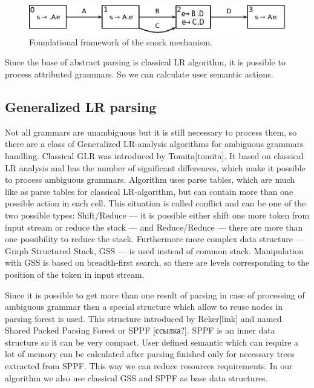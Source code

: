 \documentclass{sigplanconf}
\begin{document}
\begin{figure}
    \begin{center}
        \includegraphics[scale=0.5]{Graphs/simple_grammar_items.eps}
    \end{center}
    \caption{Foundational framework of the snork mechanism.}
    \label{fig-ffsm}
\end{figure}

Since the base of abstract parsing is classical LR algorithm, it is possible to process attributed grammars. So we can calculate user semantic actions. 

\subsection{Generalized LR parsing}
	Not all grammars are unambiguous but it is still necessary to process them, so there are a class of Generalized LR-analysis algorithms for ambiguous grammars handling. Classical GLR was introduced by Tomita[tomita]. It based on classical LR analysis and has the number of significant differences, which make it possible to process ambiguous grammars. Algorithm uses parse tables, which are much like as parse tables for classical LR-algorithm, but can contain more than one possible action in each cell. This situation is called conflict and can be one of the two possible types: Shift/Reduce — it is possible either shift one more token from input stream or reduce the stack — and Reduce/Reduce — there are more than one possibility to reduce the stack. Furthermore more complex data structure — Graph Structured Stack, GSS — is used instead of common stack. Manipulation with GSS is based on breadth-first search, so there are levels corresponding to the position of the token in input stream. 

Since it is possible to get more than one result of parsing in case of processing of ambiguous grammar then a special structure which allow to reuse nodes in parsing forest is used. This structure introduced by Reker[link] and named Shared Packed Parsing Forest or SPPF [ссылка?]. SPPF is an inner data structure so it can be very compact. User defined semantic which can require a lot of memory can be calculated after parsing finished only for necessary trees extracted from SPPF. This way we can reduce resources requirements. In our algorithm we also use classical GSS and SPPF as base data structures.
\end{document}
